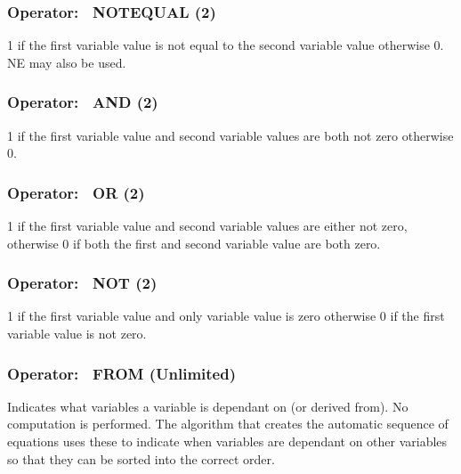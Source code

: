 \subsubsection{Operator:~ NOTEQUAL (2)}\label{operator-notequal-2}

1 if the first variable value is not equal to the second variable value otherwise 0. NE may also be used.

\subsubsection{Operator:~ AND (2)}\label{operator-and-2}

1 if the first variable value and second variable values are both not zero otherwise 0.

\subsubsection{Operator:~ OR (2)}\label{operator-or-2}

1 if the first variable value and second variable values are either not zero, otherwise 0 if both the first and second variable value are both zero.

\subsubsection{Operator:~ NOT (2)}\label{operator-not-2}

1 if the first variable value and only variable value is zero otherwise 0 if the first variable value is not zero.

\subsubsection{Operator:~ FROM (Unlimited)}\label{operator-from-unlimited}

Indicates what variables a variable is dependant on (or derived from). No computation is performed. The algorithm that creates the automatic sequence of equations uses these to indicate when variables are dependant on other variables so that they can be sorted into the correct order.
